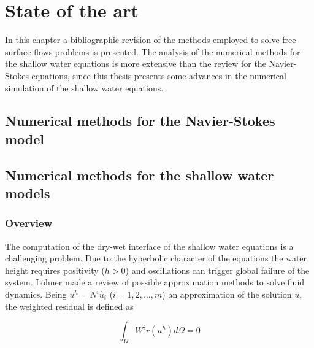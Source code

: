 
\section{State of the art}
\label{state_art}


In this chapter a bibliographic revision of the methods employed to solve free surface flows problems is presented.
The analysis of the numerical methods for the shallow water equations is more extensive than the review for the Navier-Stokes equations, since this thesis presents some advances in the numerical simulation of the shallow water equations.



\subsection{Numerical methods for the Navier-Stokes model}





\subsection{Numerical methods for the shallow water models}


\subsubsection{Overview}

The computation of the dry-wet interface of the shallow water equations is a challenging problem. Due to the hyperbolic character of the equations the water height requires positivity ($h>0$) and oscillations can trigger global failure of the system. Löhner \cite{lohner2008} made a review of possible approximation methods to solve fluid dynamics. Being $u^h = N^i\hat{u}_i$ ($i=1,2,\dots,m$) an approximation of the solution $u$, the weighted residual is defined as

\begin{equation}
\int_{\Omega} W^ir(u^h)d\Omega = 0
\end{equation}

